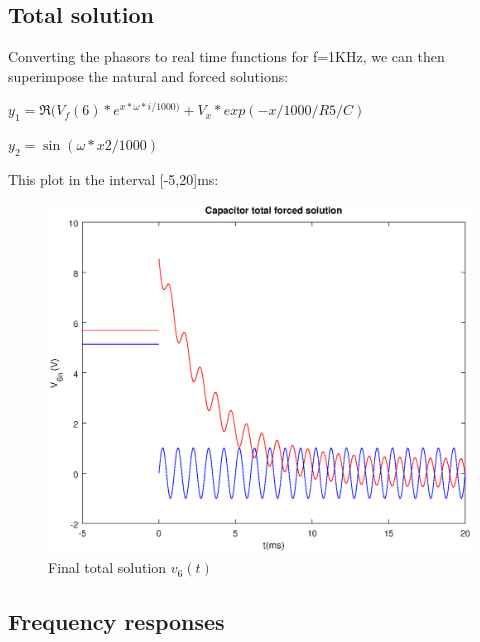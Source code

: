   

\subsection{Total solution}

Converting the phasors to real time functions for f=1KHz, we can then superimpose the natural and forced solutions:

$y_1=\Re(V_f(6)*e^{x*\omega*i/1000)}+V_x*exp(-x/1000/R5/C)$

$y_2=\sin(\omega*x2/1000)$



  This plot in the interval [-5,20]ms:

  \begin{figure}[H] \centering
    \includegraphics[width=1\linewidth]{forced.eps}
    \caption{Final total solution $v_{6}(t)$}
    \label{fig:total}
    \end{figure}
    
\subsection{Frequency responses}
      
